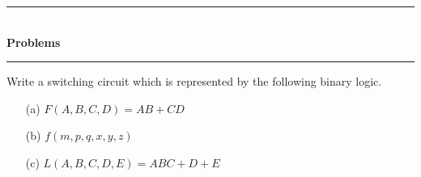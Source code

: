 \newpage

\begin{center}
\rule{4cm}{1pt}\\
{\bf\Large Problems}\\[-3pt]
\rule{4cm}{1pt}
\end{center}

\begin{problem}\label{prob5.48}
Write a switching circuit which is represented by the following binary logic.
\begin{itemize}
\item[(a)] $F(A,B,C,D)=AB+CD$

\item[(b)] $f(m,p,q,x,y,z)$

\item[(c)] $L(A,B,C,D,E)=ABC+D+E$
\end{itemize}
\end{problem}


